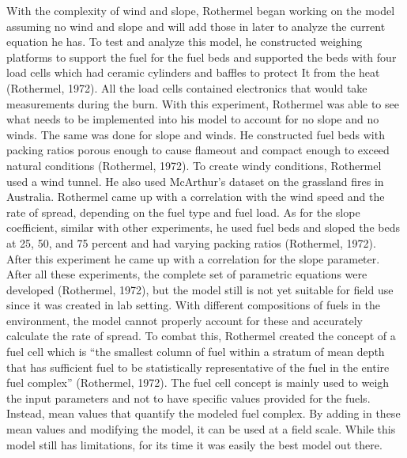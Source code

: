 \documentclass{article}
\begin{document}
\indent With the complexity of wind and slope, Rothermel began working on the model assuming no wind and slope and will add those in later to analyze the current equation he has. To test and analyze this model, he constructed weighing platforms to support the fuel for the fuel beds and supported the beds with four load cells which had ceramic cylinders and baffles to protect It from the heat (Rothermel, 1972). All the load cells contained electronics that would take measurements during the burn. With this experiment, Rothermel was able to see what needs to be implemented into his model to account for no slope and no winds. The same was done for slope and winds. He constructed fuel beds with packing ratios porous enough to cause flameout and compact enough to exceed natural conditions (Rothermel, 1972). To create windy conditions, Rothermel used a wind tunnel. He also used McArthur’s dataset on the grassland fires in Australia. Rothermel came up with a correlation with the wind speed and the rate of spread, depending on the fuel type and fuel load. As for the slope coefficient, similar with other experiments, he used fuel beds and sloped the beds at 25, 50, and 75 percent and had varying packing ratios (Rothermel, 1972). After this experiment he came up with a correlation for the slope parameter. \\
\indent After all these experiments, the complete set of parametric equations were developed (Rothermel, 1972), but the model still is not yet suitable for field use since it was created in lab setting. With different compositions of fuels in the environment, the model cannot properly account for these and accurately calculate the rate of spread. To combat this, Rothermel created the concept of a fuel cell which is “the smallest column of fuel within a stratum of mean depth that has sufficient fuel to be statistically representative of the fuel in the entire fuel complex” (Rothermel, 1972). The fuel cell concept is mainly used to weigh the input parameters and not to have specific values provided for the fuels. Instead, mean values that quantify the modeled fuel complex. By adding in these mean values and modifying the model, it can be used at a field scale. While this model still has limitations, for its time it was easily the best model out there. \\
\end{document}
